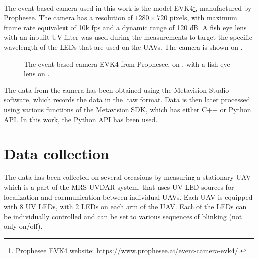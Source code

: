 The event based camera used in this work is the model EVK4\footnote{Prophesee EVK4 website: \url{https://www.prophesee.ai/event-camera-evk4/}.}, manufactured by Prophesee. The camera has a resolution of 
$1280 \times 720$ pixels, with maximum frame rate equivalent of 10k fps and a dynamic range of 120 dB.
A fish eye lens with an inbuilt UV filter was used during the measurements to target the specific wavelength of the LEDs
that are used on the UAVs. The camera is shown on . 

\begin{figure}[htbp]
  \centering
  \caption{
The event based camera EVK4 from Prophesee, on , with a fish eye lens on .
}
  \label{fig:evk4}
\end{figure}

The data from the camera has been obtained using the Metavision Studio software, which records the data in the .raw format.
Data is then later processed using various functions of the Metavision SDK, which has either C++ or Python API. In this work,
the Python API has been used.

\section{Data collection}

The data has been collected on several occasions by measuring a stationary UAV which is a part of the MRS UVDAR system, that
uses UV \ac{LED} sources for localization and communication between individual UAVs. 
Each UAV is equipped with 8 UV LEDs, with 2 LEDs on each arm of the UAV. Each of the LEDs can be individually controlled
and can be set to various sequences of blinking (not only on/off).

